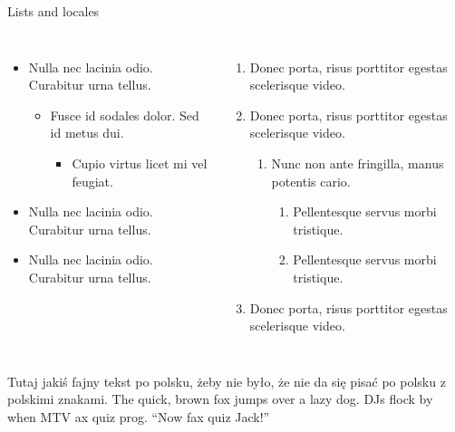 \documentclass[aspectratio=169]{beamer}
\begin{document}
\begin{frame}[label=lists]{Lists and locales}
    \begin{columns}[onlytextwidth]
        \begin{itemize}
        \item Nulla nec lacinia odio. Curabitur urna tellus.
        \begin{itemize}
            \item Fusce id sodales dolor. Sed id metus dui.
            \begin{itemize}
            \item Cupio virtus licet mi vel feugiat.
            \end{itemize}
        \end{itemize}
        \item Nulla nec lacinia odio. Curabitur urna tellus.
        \item Nulla nec lacinia odio. Curabitur urna tellus.
        \end{itemize}
        \begin{enumerate}
        \item Donec porta, risus porttitor egestas scelerisque video.
        \item Donec porta, risus porttitor egestas scelerisque video.
        \begin{enumerate}
            \item Nunc non ante fringilla, manus potentis cario.
            \begin{enumerate}
            \item Pellentesque servus morbi tristique.
            \item Pellentesque servus morbi tristique.
            \end{enumerate}
        \end{enumerate}
        \item Donec porta, risus porttitor egestas scelerisque video.
        \end{enumerate}
    \end{columns}
    \bigskip
    \justifying

    {Tutaj jakiś fajny tekst po polsku, żeby nie było, że
    nie da się pisać po polsku z polskimi znakami.}
    {The quick, brown fox jumps over a lazy
    dog. DJs flock by when MTV ax quiz prog. “Now fax quiz Jack!”}
\end{frame}
\end{document}
